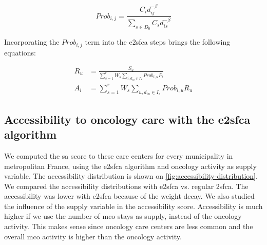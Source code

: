 \begin{equation}
    Prob_{i,j} = \frac{C_i d_{ij}^{-\beta}}{\sum_{s \in D_0} C_s d_{is}^{-\beta}}
    \label{eq:huff-prob}
\end{equation}

Incorporating the $Prob_{i,j}$ term into the \ac{e2sfca} steps brings the
following equations:

\begin{align}
    R_u & =  \frac{S_u}{\sum_{s=1}^{r} W_s \sum_{i, d_{iu} \in I_s} Prob_{i,u} P_i} \\
    A_i & = \sum_{s=1}^{r} W_s \sum_{u, d_{iu} \in I_s} Prob_{i,u} R_u
\end{align}

\subsection{Accessibility to oncology care with the \acl{e2sfca} algorithm}

We computed the \ac{sa} score to these care centers for every municipality in
metropolitan France, using the \ac{e2sfca} algorithm and oncology activity as
supply variable. The accessibility distribution is shown on
\cref{fig:accessibility-distribution}. We compared the accessibility
distributions with \ac{e2sfca} vs. regular \ac{2sfca}. The accessibility was
lower with \ac{e2sfca} because of the weight decay. We also studied the
influence of the supply variable in the accessibility score. Accessibility is
much higher if we use the number of \ac{mco} stays as supply, instead of the
oncology activity. This makes sense since oncology care centers are less common
and the overall \ac{mco} activity is higher than the oncology activity.

